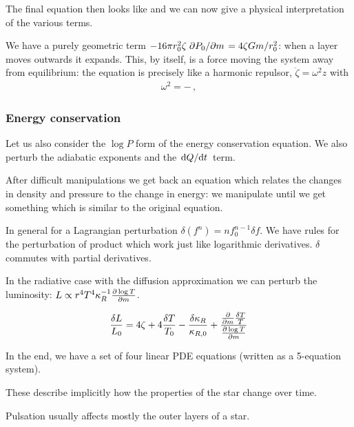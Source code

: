 \documentclass[main.tex]{subfiles}
\begin{document}
The final equation then looks like 
%
%
and we can now give a physical interpretation of the various terms.  

We have a purely geometric term \(-16 \pi r_0^2 \zeta \pdv*{P_0}{m} = 4 \zeta Gm /r_0^2\): when a layer moves outwards it expands.
This, by itself, is a force moving the system away from equilibrium: the equation is precisely like a harmonic repulsor, \(\ddot{\zeta} = \omega^2 z\) with 
%
\begin{align}
\omega^2 = -
\,,
\end{align}
%


\subsubsection{Energy conservation}

Let us also consider the \(\log P\) form of the energy conservation equation.
We also perturb the adiabatic exponents and the \(\dv*{Q}{t} \) term.

After difficult manipulations we get back an equation which relates the changes in density and pressure to the change in energy: we manipulate until we get something which is similar to the original equation.

In general for a Lagrangian perturbation \(\delta (f^n) = n f_0^{n-1} \delta f\).
We have rules for the perturbation of product which work just like logarithmic derivatives. \(\delta\) commutes with partial derivatives.

In the radiative case with the diffusion approximation we can perturb the luminosity: \(L  \propto r^4 T^4 \kappa_R^{-1} \pdv{\log T}{m}\).

\begin{equation}
  \frac{\delta L}{L_0} = 4 \zeta + 4 \frac{\delta T}{T_0} - \frac{\delta \kappa_R}{\kappa_{R,0}} + \frac{\pdv{}{m}  \frac{\delta T}{T}}{\pdv{\log T}{m}}
\end{equation}

In the end, we have a set of four linear PDE equations (written as a 5-equation system).

These describe implicitly how the properties of the star change over time.

Pulsation usually affects mostly the outer layers of a star.
\end{document}
